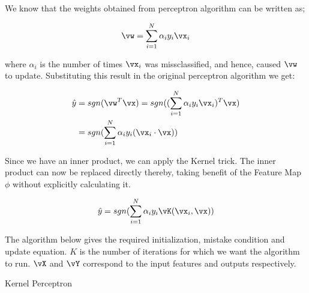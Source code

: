 \documentclass[a4paper,11pt]{article}
\begin{document}
\begin{mlsolution}

We know that the weights obtained from perceptron algorithm can be written as;

\begin{equation*}
    \vw = \sum_{i=1}^N\alpha_iy_i\vx_i
\end{equation*}

where $\alpha_i$ is the number of times $\vx_i$ was missclassified, and hence, caused $\vw$ to update. Substituting this result in the original perceptron algorithm we get:

\begin{equation*}
    \begin{split}
        \hat{y}{}& = sgn(\vw^T\vx) = sgn((\sum_{i=1}^N\alpha_iy_i\vx_i)^T\vx)\\
        & = sgn(\sum_{i=1}^N\alpha_iy_i(\vx_i\cdot\vx))
    \end{split}
\end{equation*}

Since we have an inner product, we can apply the Kernel trick. The inner product can now be replaced directly thereby, taking benefit of the Feature Map $\phi$ without explicitly calculating it.

\begin{equation*}
    \hat{y} = sgn(\sum_{i=1}^N\alpha_iy_i\vK(\vx_i,\vx))
\end{equation*}

The algorithm below gives the required initialization, mistake condition and update equation. $K$ is the number of iterations for which we want the algorithm to run. $\vX$ and $\vY$ correspond to the input features and outputs respectively. \\

\begin{algorithm}[H]
\DontPrintSemicolon
\SetAlgoLined
{}
\caption{Kernel Perceptron}
\end{algorithm}


\end{mlsolution}
\end{document}
